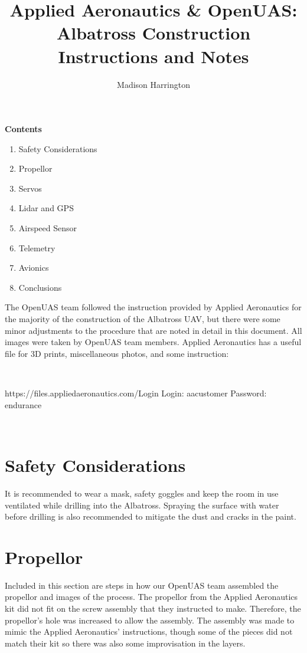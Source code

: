 \documentclass{article}
\begin{document}
\title{\bf Applied Aeronautics \& OpenUAS: Albatross Construction Instructions and Notes}
\author{Madison Harrington}
\maketitle


\textbf{Contents}
\begin{enumerate}
\item Safety Considerations
\item Propellor
\item Servos
\item Lidar and GPS
\item Airspeed Sensor
\item Telemetry
\item Avionics 
\item Conclusions \newline
\end{enumerate}
The OpenUAS team followed the instruction provided by Applied Aeronautics for the majority of the construction of the Albatross UAV, but there were some minor adjustments to the procedure that are noted in detail in this document. All images were taken by OpenUAS team members.
Applied Aeronautics has a useful file for 3D prints, miscellaneous photos, and some instruction:

\ \

https://files.appliedaeronautics.com/Login \newline
Login: aacustomer \newline
Password: endurance \newline

\ \ 
\clearpage
\section{Safety Considerations}

It is recommended to wear a mask, safety goggles and keep the room in use ventilated while drilling into the Albatross. Spraying the surface with water before drilling is also recommended to mitigate the dust and cracks in the paint. \newline
\clearpage

\section{Propellor} 
Included in this section are steps in how our OpenUAS team assembled the propellor and images of the process. The propellor from the Applied Aeronautics kit did not fit on the screw assembly that they instructed to make. Therefore, the propellor's hole was increased to allow the assembly. The assembly was made to mimic the Applied Aeronautics' instructions, though some of the pieces did not match their kit so there was also some improvisation in the layers.
\end{document}
